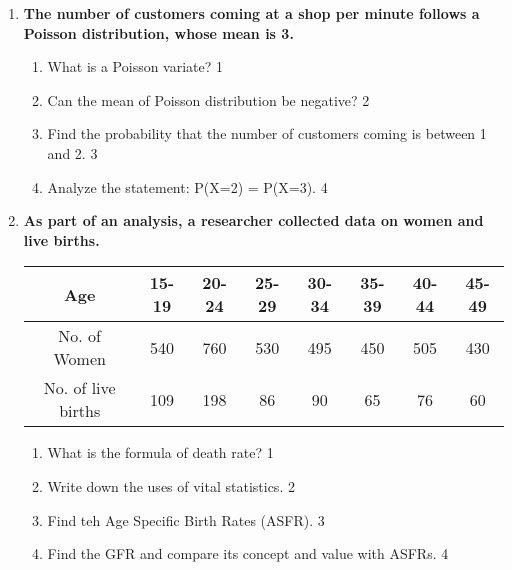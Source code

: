 \documentclass{article}
\begin{document}
\begin{enumerate}
    \item
	  \textbf{The number of customers coming at a shop per minute follows a Poisson distribution,  whose mean is 3.} 
  
  \begin{enumerate}
    \item
	What is a Poisson variate? \hfill 1
    \item
	Can the mean of Poisson distribution be negative? \hfill 2
    \item  
	Find the probability that the number of customers coming is between 1 and 2. \hfill 3
    \item
	Analyze the statement: P(X=2) = P(X=3).  \hfill 4
  \end{enumerate}
  

     \item
	  \textbf{As part of an analysis, a researcher collected data on women and live births.} 
	  \begin{table}[H]
	  \centering
\begin{tabular}{c|c|c|c|c|c|c|c}
Age & 15-19 & 20-24 & 25-29 & 30-34 & 35-39 & 40-44 & 45-49 \\ \hline
No. of Women & 540 & 760 & 530 & 495 & 450 & 505 & 430 \\ \hline
No. of live births & 109 & 198 & 86 & 90 & 65 & 76 & 60
\end{tabular}
\end{table}
  
  \begin{enumerate}
    \item
	What is the formula of death rate? \hfill 1
    \item
	Write down the uses of vital statistics. \hfill 2
    \item  
	Find teh Age Specific Birth Rates (ASFR). \hfill 3
    \item
	Find the GFR and compare its concept and value with ASFRs. \hfill 4
  \end{enumerate}
  

  
\end{enumerate}
\end{document}
